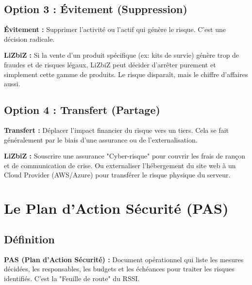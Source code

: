 \subsection{Option 3 : Évitement (Suppression)}

\begin{boxdef}
\textbf{Évitement :} Supprimer l'activité ou l'actif qui génère le risque. C'est une décision radicale.
\end{boxdef}

\begin{boxlizbiz}
\textbf{LiZbiZ :} Si la vente d'un produit spécifique (ex: kits de survie) génère trop de fraudes et de risques légaux, LiZbiZ peut décider d'arrêter purement et simplement cette gamme de produits. Le risque disparaît, mais le chiffre d'affaires aussi.
\end{boxlizbiz}

\subsection{Option 4 : Transfert (Partage)}

\begin{boxdef}
\textbf{Transfert :} Déplacer l'impact financier du risque vers un tiers. Cela se fait généralement par le biais d'une assurance ou de l'externalisation.
\end{boxdef}

\begin{boxlizbiz}
\textbf{LiZbiZ :} Souscrire une assurance "Cyber-risque" pour couvrir les frais de rançon et de communication de crise. Ou externaliser l'hébergement du site web à un Cloud Provider (AWS/Azure) pour transférer le risque physique du serveur.
\end{boxlizbiz}

\section{Le Plan d'Action Sécurité (PAS)}

\subsection{Définition}

\begin{boxdef}
\textbf{PAS (Plan d'Action Sécurité) :} Document opérationnel qui liste les mesures décidées, les responsables, les budgets et les échéances pour traiter les risques identifiés. C'est la "Feuille de route" du RSSI.
\end{boxdef}

